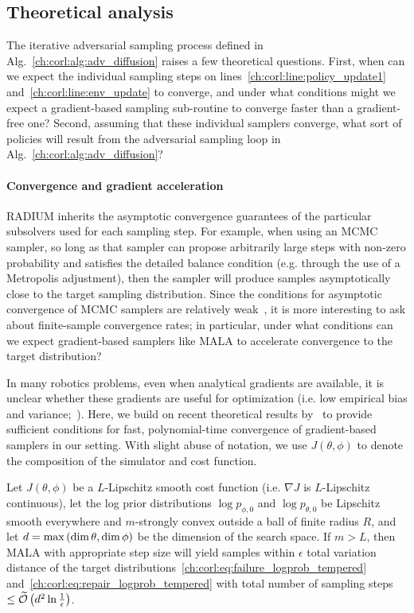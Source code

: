 \subsection{Theoretical analysis}\label{ch:corl:theory}

The iterative adversarial sampling process defined in Alg.~\ref{ch:corl:alg:adv_diffusion} raises a few theoretical questions. First, when can we expect the individual sampling steps on lines~\ref{ch:corl:line:policy_update1} and~\ref{ch:corl:line:env_update} to converge, and under what conditions might we expect a gradient-based sampling sub-routine to converge faster than a gradient-free one? Second, assuming that these individual samplers converge, what sort of policies will result from the adversarial sampling loop in Alg.~\ref{ch:corl:alg:adv_diffusion}?

\paragraph{Convergence and gradient acceleration}
RADIUM inherits the asymptotic convergence guarantees of the particular subsolvers used for each sampling step. For example, when using an MCMC sampler, so long as that sampler can propose arbitrarily large steps with non-zero probability and satisfies the detailed balance condition (e.g. through the use of a Metropolis adjustment), then the sampler will produce samples asymptotically close to the target sampling distribution. Since the conditions for asymptotic convergence of MCMC samplers are relatively weak~\cite{hastingsMonteCarloSampling1970}, it is more interesting to ask about finite-sample convergence rates; in particular, under what conditions can we expect gradient-based samplers like MALA to accelerate convergence to the target distribution?

In many robotics problems, even when analytical gradients are available, it is unclear whether these gradients are useful for optimization (i.e. low empirical bias and variance;~\cite{suhDifferentiableSimulatorsGive2022}). Here, we build on recent theoretical results by~\cite{maSamplingCanBe2019} to provide sufficient conditions for fast, polynomial-time convergence of gradient-based samplers in our setting. With slight abuse of notation, we use $J(\theta, \phi)$ to denote the composition of the simulator and cost function.

\begin{theorem}\label{ch:corl:thm:convergence}
    Let $J(\theta, \phi)$ be a $L$-Lipschitz smooth cost function (i.e. $\nabla J$ is $L$-Lipschitz continuous), let the log prior distributions $\log p_{\phi ,0}$ and $\log p_{\theta,0}$ be Lipschitz smooth everywhere and $m$-strongly convex outside a ball of finite radius $R$, and let $d = \max\left( \dim{\theta}, \dim{\phi} \right)$ be the dimension of the search space. If $m > L$, then MALA with appropriate step size will yield samples within $\epsilon$ total variation distance of the target distributions~\eqref{ch:corl:eq:failure_logprob_tempered} and~\eqref{ch:corl:eq:repair_logprob_tempered} with total number of sampling steps $\leq \widetilde{\mathcal{O}}\left( d^2 \ln\frac{1}{\epsilon} \right)$.
\end{theorem}

